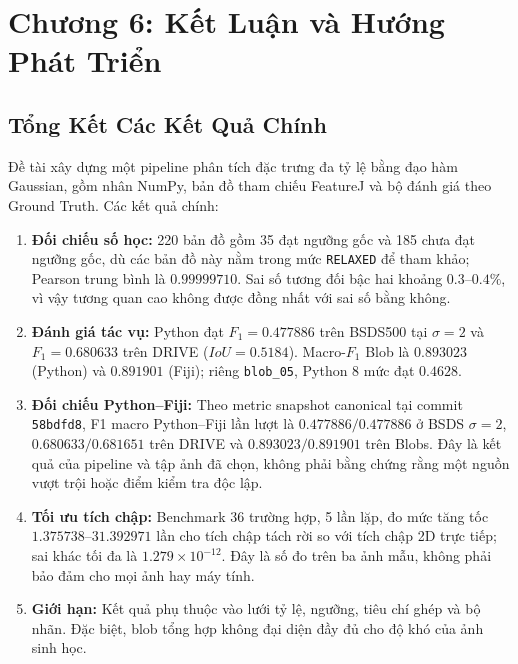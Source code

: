 \documentclass[conference]{IEEEtran}
\begin{document}








\section{Chương 6: Kết Luận và Hướng Phát Triển}

\subsection{Tổng Kết Các Kết Quả Chính}
Đề tài xây dựng một pipeline phân tích đặc trưng đa tỷ lệ bằng đạo hàm Gaussian, gồm nhân NumPy, bản đồ tham chiếu FeatureJ và bộ đánh giá theo Ground Truth. Các kết quả chính:
\begin{enumerate}
    \item \textbf{Đối chiếu số học:} 220 bản đồ gồm 35 đạt ngưỡng gốc và 185 chưa đạt ngưỡng gốc, dù các bản đồ này nằm trong mức \texttt{RELAXED} để tham khảo; Pearson trung bình là $0.99999710$. Sai số tương đối bậc hai khoảng $0.3$--$0.4\%$, vì vậy tương quan cao không được đồng nhất với sai số bằng không.
    \item \textbf{Đánh giá tác vụ:} Python đạt $F_1=0.477886$ trên BSDS500 tại $\sigma=2$ và $F_1=0.680633$ trên DRIVE ($IoU=0.5184$). Macro-$F_1$ Blob là $0.893023$ (Python) và $0.891901$ (Fiji); riêng \texttt{blob\_05}, Python 8 mức đạt $0.4628$.
    \item \textbf{Đối chiếu Python--Fiji:} Theo metric snapshot canonical tại commit \texttt{58bdfd8}, F1 macro Python--Fiji lần lượt là $0.477886/0.477886$ ở BSDS $\sigma=2$, $0.680633/0.681651$ trên DRIVE và $0.893023/0.891901$ trên Blobs. Đây là kết quả của pipeline và tập ảnh đã chọn, không phải bằng chứng rằng một nguồn vượt trội hoặc điểm kiểm tra độc lập.
    \item \textbf{Tối ưu tích chập:} Benchmark 36 trường hợp, 5 lần lặp, đo mức tăng tốc $1.375738$--$31.392971$ lần cho tích chập tách rời so với tích chập 2D trực tiếp; sai khác tối đa là $1.279\times10^{-12}$. Đây là số đo trên ba ảnh mẫu, không phải bảo đảm cho mọi ảnh hay máy tính.
    \item \textbf{Giới hạn:} Kết quả phụ thuộc vào lưới tỷ lệ, ngưỡng, tiêu chí ghép và bộ nhãn. Đặc biệt, blob tổng hợp không đại diện đầy đủ cho độ khó của ảnh sinh học.
\end{enumerate}
\end{document}
